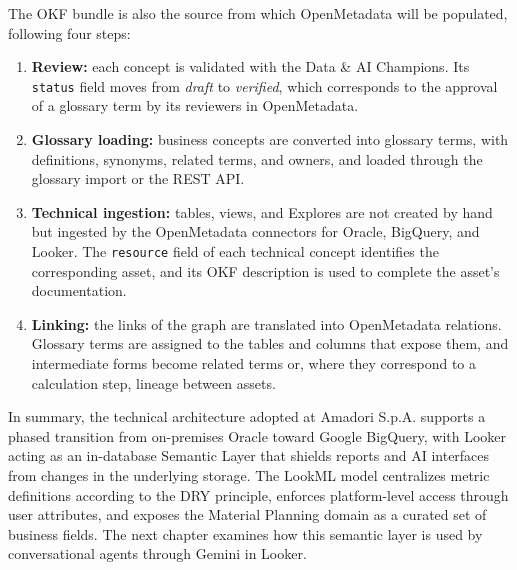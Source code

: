 The OKF bundle is also the source from which OpenMetadata will be populated, following four steps:
\begin{enumerate}
    \item \textbf{Review:} each concept is validated with the Data \& AI Champions. Its \texttt{status} field moves from \textit{draft} to \textit{verified}, which corresponds to the approval of a glossary term by its reviewers in OpenMetadata.
    \item \textbf{Glossary loading:} business concepts are converted into glossary terms, with definitions, synonyms, related terms, and owners, and loaded through the glossary import or the REST API.
    \item \textbf{Technical ingestion:} tables, views, and Explores are not created by hand but ingested by the OpenMetadata connectors for Oracle, BigQuery, and Looker. The \texttt{resource} field of each technical concept identifies the corresponding asset, and its OKF description is used to complete the asset's documentation.
    \item \textbf{Linking:} the links of the graph are translated into OpenMetadata relations. Glossary terms are assigned to the tables and columns that expose them, and intermediate forms become related terms or, where they correspond to a calculation step, lineage between assets.
\end{enumerate}

\bigskip
In summary, the technical architecture adopted at Amadori S.p.A. supports a phased transition from on-premises Oracle toward Google BigQuery, with Looker acting as an in-database Semantic Layer that shields reports and AI interfaces from changes in the underlying storage. The LookML model centralizes metric definitions according to the DRY principle, enforces platform-level access through user attributes, and exposes the Material Planning domain as a curated set of business fields. The next chapter examines how this semantic layer is used by conversational agents through Gemini in Looker.